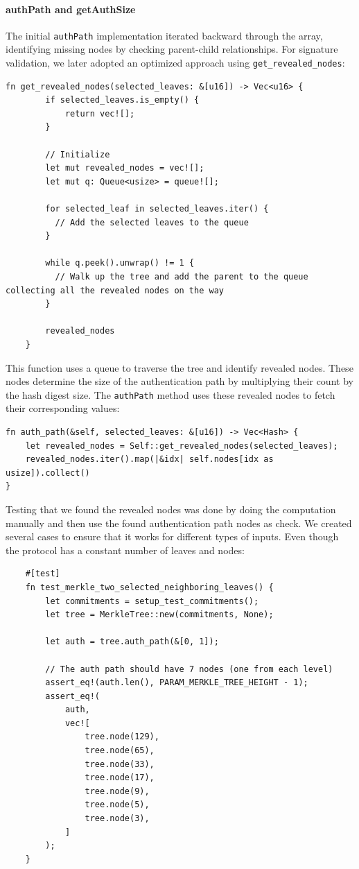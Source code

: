 \documentclass[11pt]{report}
\theoremstyle{definition}
\theoremstyle{plain}
\begin{document}
\paragraph{authPath and getAuthSize}\label{sec:auth_path}
The initial \texttt{authPath} implementation iterated backward through the array, identifying missing nodes by checking parent-child relationships. For signature validation, we later adopted an optimized approach using \texttt{get\_revealed\_nodes}:
\begin{verbatim}
fn get_revealed_nodes(selected_leaves: &[u16]) -> Vec<u16> {
        if selected_leaves.is_empty() {
            return vec![];
        }

        // Initialize
        let mut revealed_nodes = vec![];
        let mut q: Queue<usize> = queue![];

        for selected_leaf in selected_leaves.iter() {
          // Add the selected leaves to the queue
        }

        while q.peek().unwrap() != 1 {
          // Walk up the tree and add the parent to the queue collecting all the revealed nodes on the way
        }

        revealed_nodes
    }

\end{verbatim}
This function uses a queue to traverse the tree and identify revealed nodes. These nodes determine the size of the authentication path by multiplying their count by the hash digest size. The \texttt{authPath} method uses these revealed nodes to fetch their corresponding values:
\begin{verbatim}
fn auth_path(&self, selected_leaves: &[u16]) -> Vec<Hash> {
    let revealed_nodes = Self::get_revealed_nodes(selected_leaves);
    revealed_nodes.iter().map(|&idx| self.nodes[idx as usize]).collect()
}
\end{verbatim}
Testing that we found the revealed nodes was done by doing the computation manually and then use the found authentication path nodes as check. We created several cases to ensure that it works for different types of inputs. Even though the protocol has a constant number of leaves and nodes:
\begin{verbatim}
    #[test]
    fn test_merkle_two_selected_neighboring_leaves() {
        let commitments = setup_test_commitments();
        let tree = MerkleTree::new(commitments, None);

        let auth = tree.auth_path(&[0, 1]);

        // The auth path should have 7 nodes (one from each level)
        assert_eq!(auth.len(), PARAM_MERKLE_TREE_HEIGHT - 1);
        assert_eq!(
            auth,
            vec![
                tree.node(129),
                tree.node(65),
                tree.node(33),
                tree.node(17),
                tree.node(9),
                tree.node(5),
                tree.node(3),
            ]
        );
    }
\end{verbatim}
\end{document}
